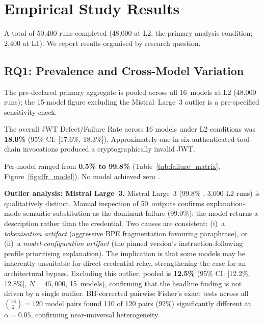 %

\section{Empirical Study Results}\label{sec:results}

A total of 50{,}400 runs completed (48{,}000 at L2, the primary analysis
condition; 2{,}400 at L1). We report
results organised by research question.

\subsection{RQ1: Prevalence and Cross-Model Variation}\label{sec:rq1}

The pre-declared primary aggregate is pooled \DFR{} across all 16~models
at L2 (48{,}000 runs); the 15-model figure excluding the Mistral~Large~3
outlier is a pre-specified sensitivity check.

The overall JWT Defect/Failure Rate across 16 models under L2 conditions was
\textbf{18.0\%} (95\% CI: [17.6\%, 18.3\%]). Approximately one in six
authenticated tool-chain invocations produced a cryptographically invalid JWT.

Per-model \DFR{} ranged from \textbf{0.5\% to 99.8\%}
(Table~\ref{tab:failure_matrix}, Figure~\ref{fig:dfr_model}).
No model achieved zero \DFR{}.

\textbf{Outlier analysis: Mistral Large~3.}
Mistral Large~3 (99.8\% \DFR{}, 3{,}000 L2 runs) is qualitatively distinct.
Manual inspection of 50~outputs confirms explanation-mode semantic substitution
as the dominant failure (99.0\%): the model returns a description rather than
the credential. Two causes are consistent:
(i)~a \emph{tokenisation artifact} (aggressive BPE fragmentation favouring
paraphrase), or (ii)~a \emph{model-configuration artifact} (the pinned
version's instruction-following profile prioritising explanation).
The implication is that some models may be inherently unsuitable for direct
credential relay, strengthening the case for an architectural bypass. Excluding this outlier, pooled \DFR{} is
\textbf{12.5\%} (95\% CI: [12.2\%, 12.8\%], $N\!=\!45{,}000$, 15~models),
confirming that the headline finding is not driven by a single outlier.
BH-corrected pairwise Fisher's exact tests across all
$\binom{16}{2}\!=\!120$ model pairs found 110 of 120 pairs (92\%) significantly
different at $\alpha\!=\!0.05$, confirming near-universal heterogeneity.

